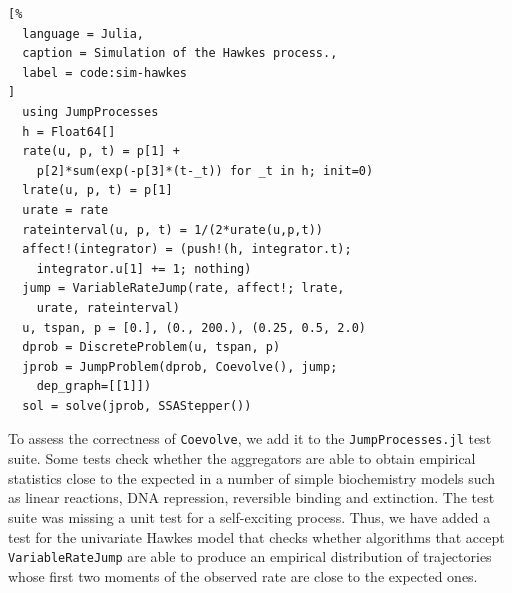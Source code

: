 \documentclass{juliacon}
\numberwithin{equation}{section}
\begin{document}
\begin{lstlisting}[%
  language = Julia,
  caption = Simulation of the Hawkes process.,
  label = code:sim-hawkes
]
  using JumpProcesses
  h = Float64[]
  rate(u, p, t) = p[1] +
    p[2]*sum(exp(-p[3]*(t-_t)) for _t in h; init=0)
  lrate(u, p, t) = p[1]
  urate = rate
  rateinterval(u, p, t) = 1/(2*urate(u,p,t))
  affect!(integrator) = (push!(h, integrator.t);
    integrator.u[1] += 1; nothing)
  jump = VariableRateJump(rate, affect!; lrate,
    urate, rateinterval)
  u, tspan, p = [0.], (0., 200.), (0.25, 0.5, 2.0)
  dprob = DiscreteProblem(u, tspan, p)
  jprob = JumpProblem(dprob, Coevolve(), jump;
    dep_graph=[[1]])
  sol = solve(jprob, SSAStepper())
\end{lstlisting}

To assess the correctness of \texttt{Coevolve}, we add it to the \texttt{JumpProcesses.jl} test suite. Some tests check whether the aggregators are able to obtain empirical statistics close to the expected in a number of simple biochemistry models such as linear reactions, DNA repression, reversible binding and extinction. The test suite was missing a unit test for a self-exciting process. Thus, we have added a test for the univariate Hawkes model that checks whether algorithms that accept \texttt{VariableRateJump} are able to produce an empirical distribution of trajectories whose first two moments of the observed rate are close to the expected ones.
\end{document}
